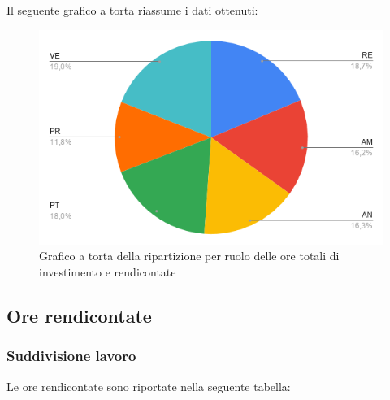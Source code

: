 {{{{{{{{{{{{Il seguente grafico a torta riassume i dati ottenuti:
\begin{figure}[!ht]
	\begin{center}
		\includegraphics[width=0.8\linewidth]{../immagini/pdp/torta_suddvisione_lavoro.png}
		\caption{Grafico a torta della ripartizione per ruolo delle ore totali di investimento e
			rendicontate}
	\end{center}
\end{figure}

\subsection{Ore rendicontate}\label{PreventivoRiepilogoOreRendicontate}

\subsubsection{Suddivisione lavoro}\label{PreventivoRiepilogoOreRendicontateSuddivisioneLavoro}
Le ore rendicontate sono riportate nella seguente tabella:
\quad
\def\tabularxcolumn#1{m{#1}}
{

}}}}}}}}}}}}}
